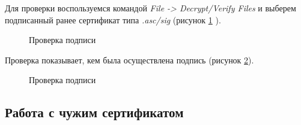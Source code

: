 \documentclass[10pt,a4paper]{report}
\begin{document}
Для проверки воспользуемся командой \textit{File -> Decrypt/Verify Files} и выберем подписанный ранее сертификат типа \textit{.asc/sig} (рисунок \ref{ris:image14} ).
\begin{figure}[h]	
\caption{Проверка подписи}
\label{ris:image14}
\end{figure}

Проверка показывает, кем была осуществлена подпись (рисунок \ref{ris:image15}).
\begin{figure}[h]	
\caption{Проверка подписи}
\label{ris:image15}
\end{figure}
\subsection{Работа с чужим сертификатом}
\end{document}
